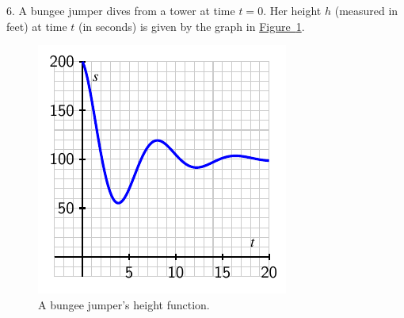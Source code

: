 \documentclass[10pt,]{book}
\theoremstyle{plain}
\theoremstyle{definition}
\theoremstyle{definition}
\theoremstyle{definition}
\theoremstyle{definition}
\theoremstyle{definition}
\numberwithin{equation}{section}
\begin{document}
\begin{exerciselist}
\item[6.]\hypertarget{ez-1-1-Bungee}{}A bungee jumper dives from a tower at time \(t=0\). Her height \(h\) (measured in feet) at time \(t\) (in seconds) is given by the graph in \hyperref[F-1-1-Ez1]{Figure~\ref{F-1-1-Ez1}}.
\leavevmode%
\begin{figure}
\centering
\includegraphics[width=0.5\linewidth]{images/1_1_Ez1}
\caption{A bungee jumper's height function.\label{F-1-1-Ez1}}
\end{figure}
\par


\end{exerciselist}
\end{document}
